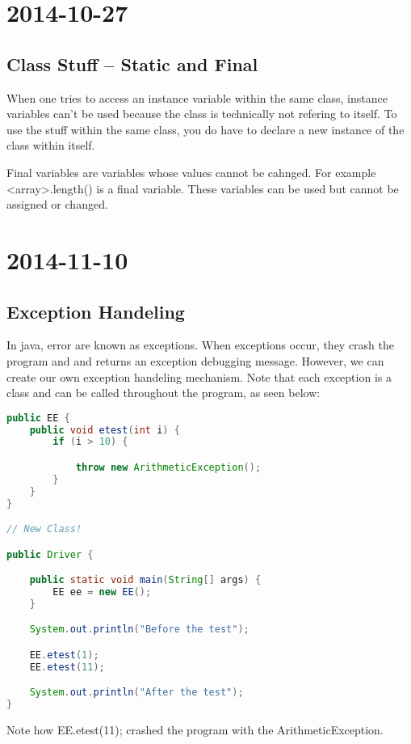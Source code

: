 \documentclass [12 pt, twoside] {article}
\begin{document}
\section{2014-10-27}
\subsection{Class Stuff -- Static and Final}


When one tries to access an instance variable within the same class,
instance variables can't be used because the class is technically
not refering to itself. To use the stuff within the same class, you
do have to declare a new instance of the class within itself.


Final variables are variables whose values cannot be cahnged. For example
<array>.length() is a final variable. These variables can be used but
cannot be assigned or changed.

\section{2014-11-10}

\subsection{Exception Handeling}


In java, error are known as exceptions. When exceptions occur, they crash the program
and and returns an exception debugging message. However, we can create our own exception
handeling mechanism. Note that each exception is a class and can be called throughout the
program, as seen below:


\begin{lstlisting}[language=java]
public EE {
	public void etest(int i) {
		if (i > 10) {

			throw new ArithmeticException();
		}
	}
}

// New Class!

public Driver {

	public static void main(String[] args) {
		EE ee = new EE();
	}

	System.out.println("Before the test");

	EE.etest(1);
	EE.etest(11);

	System.out.println("After the test");
}
\end{lstlisting}


Note how EE.etest(11); crashed the program with the ArithmeticException.
\end{document}
